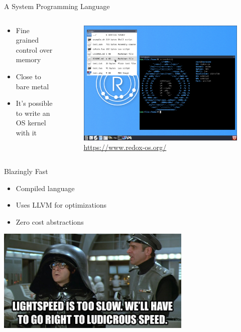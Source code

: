 \documentclass[aspectratio=1610,t]{beamer}
\begin{document}
\begin{frame}[c]{A System Programming Language}
  \begin{columns}[onlytextwidth]
    \begin{column}{.4\textwidth}
      \begin{itemize}
        \item Fine grained control over memory
        \item Close to bare metal
        \item It's possible to write an OS kernel with it
      \end{itemize}
    \end{column}
    \begin{column}{.6\textwidth}
      \begin{figure}
        \includegraphics[width=\textwidth]{./redox.png}
        \caption{\url{https://www.redox-os.org/}}
      \end{figure}
    \end{column}
  \end{columns}
\end{frame}


\begin{frame}[c]{Blazingly Fast}
  \begin{itemize}
    \item Compiled language
    \item Uses LLVM for optimizations
    \item Zero cost abstractions
  \end{itemize}
  \includegraphics[width=0.7\textwidth]{./spaceballs-meme.jpg}
\end{frame}
\end{document}
